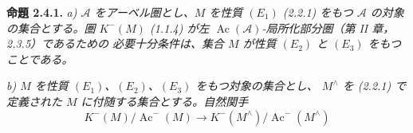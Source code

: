 \noindent\textbf{命題 2.4.1.}\quad
\textit{a) $\mathcal A$ をアーベル圏とし、$M$ を性質 $(E_1)$ (2.2.1) をもつ
$\mathcal A$ の対象の集合とする。圏 $K^{-}(M)$ (1.1.4) が左
$\operatorname{Ac}(\mathcal A)$-局所化部分圏（第 II 章，2.3.5）であるための
必要十分条件は、集合 $M$ が性質 $(E_2)$ と $(E_3)$ をもつことである。}

\noindent\textit{b) $M$ を性質 $(E_1)$、$(E_2)$、$(E_3)$ をもつ対象の集合とし、
$M^{\wedge}$ を (2.2.1) で定義された $M$ に付随する集合とする。自然関手}
\[
K^{-}(M)/\operatorname{Ac}^{-}(M)
\longrightarrow
K^{-}(M^{\wedge})/\operatorname{Ac}^{-}(M^{\wedge})
\]
\endgroup
